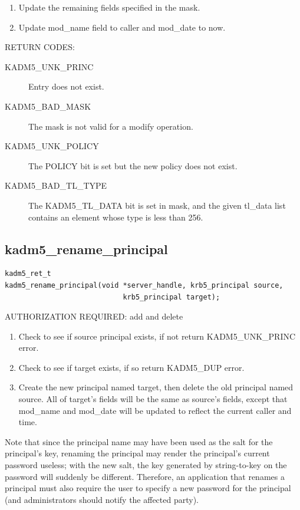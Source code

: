 \begin{enumerate}
\item Update the remaining fields specified in the mask.
\item Update mod_name field to caller and mod_date to now.
\end{enumerate}

RETURN CODES:

\begin{description}
\item[KADM5_UNK_PRINC] Entry does not exist.
\item[KADM5_BAD_MASK] The mask is not valid for a modify
operation.
\item[KADM5_UNK_POLICY] The POLICY bit is set but the new
policy does not exist.
\item[KADM5_BAD_TL_TYPE] The KADM5_TL_DATA bit is set in mask, and the
given tl_data list contains an element whose type is less than 256.
\end{description}

\subsection{kadm5_rename_principal}

\begin{verbatim}
kadm5_ret_t
kadm5_rename_principal(void *server_handle, krb5_principal source,
                            krb5_principal target);
\end{verbatim}

AUTHORIZATION REQUIRED: add and delete

\begin{enumerate}
\item Check to see if source principal exists, if not return
KADM5_UNK_PRINC error.
\item Check to see if target exists, if so return KADM5_DUP error.
\item Create the new principal named target, then delete the old
principal named source.  All of target's fields will be the same as
source's fields, except that mod_name and mod_date will be updated to
reflect the current caller and time.
\end{enumerate}

Note that since the principal name may have been used as the salt for
the principal's key, renaming the principal may render the principal's
current password useless; with the new salt, the key generated by
string-to-key on the password will suddenly be different.  Therefore,
an application that renames a principal must also require the user to
specify a new password for the principal (and administrators should
notify the affected party).

